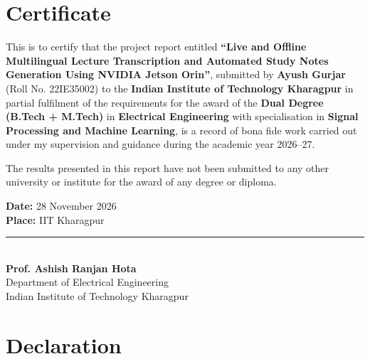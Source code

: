 \documentclass[11pt,a4paper,oneside]{report}
\begin{document}
\setcounter{page}{1}

\chapter*{Certificate}

This is to certify that the project report entitled \textbf{``Live and Offline Multilingual Lecture Transcription and Automated Study Notes Generation Using NVIDIA Jetson Orin''}, submitted by \textbf{Ayush Gurjar} (Roll No. 22IE35002) to the \textbf{Indian Institute of Technology Kharagpur} in partial fulfilment of the requirements for the award of the \textbf{Dual Degree (B.Tech + M.Tech)} in \textbf{Electrical Engineering} with specialisation in \textbf{Signal Processing and Machine Learning}, is a record of bona fide work carried out under my supervision and guidance during the academic year 2026--27. 

The results presented in this report have not been submitted to any other university or institute for the award of any degree or diploma.

\vspace{3.5cm}

\noindent
\begin{minipage}[t]{0.5\textwidth}
\textbf{Date:} 28 November 2026\\[0.2cm]
\textbf{Place:} IIT Kharagpur
\end{minipage}
\hfill
\begin{minipage}[t]{0.45\textwidth}
\rule{6.5cm}{0.4pt}\\[0.2cm]
\textbf{Prof. Ashish Ranjan Hota}\\
Department of Electrical Engineering\\
Indian Institute of Technology Kharagpur
\end{minipage}

\clearpage

\chapter*{Declaration}
\end{document}
